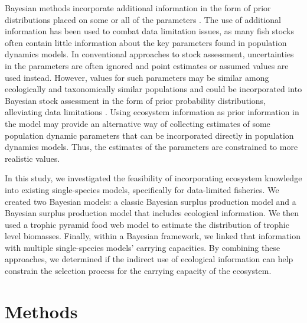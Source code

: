 \documentclass[oneside,12pt,final]{sty/ucthesis-CA2012}
\let\cite\citep                             %
\begin{document}
\begin{mainmatter}
Bayesian methods incorporate additional information in the form of prior distributions placed on some or all of the parameters \cite{mcallister1998bayesian}. The use of additional information has been used to combat data limitation issues, as many fish stocks often contain little information about the key parameters found in population dynamics models. In conventional approaches to stock assessment, uncertainties in the parameters are often ignored and point estimates or assumed values are used instead. However, values for such parameters may be similar among ecologically and taxonomically similar populations and could be incorporated into Bayesian stock assessment in the form of prior probability distributions, alleviating data limitations \cite{mcallister1998bayesian}. Using ecosystem information as prior information in the model may provide an alternative way of collecting estimates of some population dynamic parameters that can be incorporated directly in population dynamics models. Thus, the estimates of the parameters are constrained to more realistic values. 

\vspace{5mm}

In this study, we investigated the feasibility of incorporating ecosystem knowledge into existing single-species models, specifically for data-limited fisheries. We created two Bayesian models: a classic Bayesian surplus production model and a Bayesian surplus production model that includes ecological information. We then used a trophic pyramid food web model to estimate the distribution of trophic level biomasses. Finally, within a Bayesian framework, we linked that information with multiple single-species models’ carrying capacities. By combining these approaches, we determined if the indirect use of ecological information can help constrain the selection process for the carrying capacity of the ecosystem.  


\section*{Methods}

\end{mainmatter}
\end{document}

